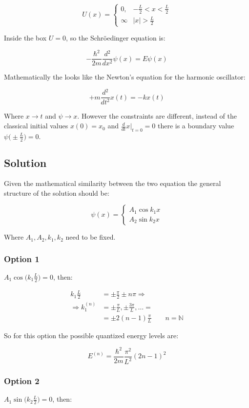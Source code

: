 $$U(x) = \begin{cases} 0, &-\frac{L}{2}<x<\frac{L}{2}\\\infty &|x|>\frac{L}{2}\end{cases}$$

Inside the box $U=0$, so the Schr\"oedinger equation is:

$$-\frac{\hbar^2}{2m}\frac{d{^2}}{d{x^2}}\psi(x) = E\psi(x)$$

Mathematically the looks like the Newton's equation for the harmonic oscillator:

$$+m \frac{d{^2}}{d{t^2}}x(t) = -kx(t)$$

Where $x\rightarrow t$ and $\psi\rightarrow x$.
However the constraints are different, instead of the classical initial values $x(0) = x_0$ and $\frac{d{}}{d{t}}x|_{t=0} = 0$ there is a boundary value $\psi\biggl(\pm \frac{L}{2}\biggr) = 0$.

  \subsection{Solution}
  Given the mathematical similarity between the two equation the general structure of the solution should be:

  $$\psi(x) = \begin{cases}A_1\cos k_1 x \\A_2\sin k_2x\end{cases}$$

  Where $A_1,A_2,k_1, k_2$ need to be fixed.

    \subsubsection{Option 1}
    $A_1\cos\biggl(k_1 \frac{L}{2}\biggr) = 0$, then:

    \begin{align*}
      k_1 \frac{L}{2} &=\pm \frac{\pi}{2}\pm n\pi\Rightarrow\\
      \Rightarrow k_1^{(n)} &=\pm \frac{\pi}{L},\pm \frac{3\pi}{L},\dots =\\
                            &= \pm 2(n-1)\frac{\pi}{L}\qquad n = \mathbb{N}
    \end{align*}

    So for this option the possible quantized energy levels are:

    $$E^{(n)} = \frac{\hbar^2}{2m}\frac{\pi^2}{L^2}(2n-1)^2$$

    \subsubsection{Option 2}
    $A_1\sin\biggl(k_2 \frac{L}{2}\biggr) = 0$, then:

